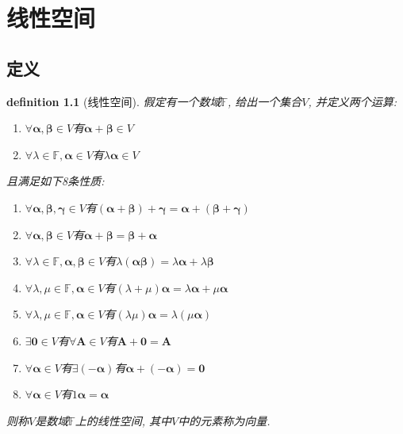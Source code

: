 \documentclass[12pt]{ctexbook}
\newtheorem{definition}{definition}
\numberwithin{definition}{section}
\numberwithin{theorem}{section}
\numberwithin{exercise}{section}
\numberwithin{example}{section}
\numberwithin{lemma}{section}
\begin{document}
    \chapter{线性空间}

    \section{定义}

    \begin{definition}
        [线性空间] 假定有一个数域\(\mathbb{F}\)\footnotemark{}, 给出一个集合\(V\), 并定义两个运算:
        \begin{enumerate}
            \item \(\forall \boldsymbol{\alpha} , \boldsymbol{\beta} \in V \)有\( \boldsymbol{\alpha} + \boldsymbol{\beta} \in V\)
            \item \(\forall \lambda \in \mathbb{F}, \boldsymbol{\alpha} \in V \)有\( \lambda \boldsymbol{\alpha} \in V\)
        \end{enumerate}
        且满足如下8条性质:
        \begin{enumerate}
            \item \(\forall \boldsymbol{\alpha} , \boldsymbol{\beta} , \boldsymbol{\gamma} \in V \)有\( (\boldsymbol{\alpha} + \boldsymbol{\beta}) + \boldsymbol{\gamma} = \boldsymbol{\alpha} + (\boldsymbol{\beta} + \boldsymbol{\gamma})\)
            \item \(\forall \boldsymbol{\alpha} , \boldsymbol{\beta} \in V\)有\( \boldsymbol{\alpha} + \boldsymbol{\beta} = \boldsymbol{\beta} + \boldsymbol{\alpha}\)
            \item \(\forall \lambda \in \mathbb{F} , \boldsymbol{\alpha} , \boldsymbol{\beta} \in V\)有\(\lambda (\boldsymbol{\alpha}\boldsymbol{\beta}) = \lambda \boldsymbol{\alpha} + \lambda \boldsymbol{\beta}\)
            \item \(\forall \lambda , \mu \in \mathbb{F}, \boldsymbol{\alpha} \in V\)有\((\lambda + \mu)\boldsymbol{\alpha} = \lambda\boldsymbol{\alpha} + \mu\boldsymbol{\alpha}\)
            \item \(\forall \lambda , \mu \in \mathbb{F}, \boldsymbol{\alpha} \in V\)有\((\lambda\mu)\boldsymbol{\alpha} = \lambda(\mu\boldsymbol{\alpha})\)
            \item \(\exists \boldsymbol{0} \in V\)有\(\forall \boldsymbol{A} \in V\)有\(\boldsymbol{A} + \boldsymbol{0} = \boldsymbol{A}\)
            \item \(\forall \boldsymbol{\alpha} \in V\)有\(\exists (-\boldsymbol{\alpha})\)有\(\boldsymbol{\alpha} + (-\boldsymbol{\alpha}) = \boldsymbol{0}\)
            \item \(\forall \boldsymbol{\alpha} \in V\)有\(1\boldsymbol{\alpha} = \boldsymbol{\alpha}\)
        \end{enumerate}
        则称\(V\)是数域\(\mathbb{F}\)上的线性空间, 其中\(V\)中的元素称为向量.\footnotemark{}
    \end{definition}
\end{document}
